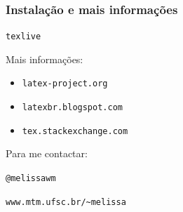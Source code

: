 \documentclass{beamer}
\begin{document}
\begin{frame}[fragile]
   \frametitle{Instalação e mais informações}
   \begin{center}
      \verb+texlive+
   \end{center}
   Mais informações:
   \begin{itemize}
      \item \verb+latex-project.org+
      \item \verb+latexbr.blogspot.com+
      \item \verb+tex.stackexchange.com+
   \end{itemize}
   Para me contactar:
   \begin{center}
   \verb+@melissawm+
          
   \verb+www.mtm.ufsc.br/~melissa+
   \end{center}
\end{frame}
\end{document}
